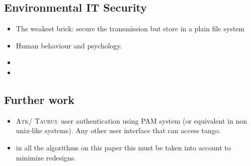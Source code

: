 \documentclass[10pt,a4paper,twoside]{llncs}
\newcommand{\taurus}{\textsc{Taurus}}
\newcommand{\atk}{\textsc{Atk}}
\begin{document}
%
\subsection{Environmental IT Security \label{sec:environment}}

\begin{itemize}
 \item The weakest brick: secure the transmission but store in a plain file system
 \item Human behaviour and psychology.
 \item 
 \item 
\end{itemize}

%
\subsection{Further work \label{sec:further}}

\begin{itemize}
\item \atk/ \taurus\, user authentication using PAM system (or equivalent in non unix-like systems). Any other user interface that can access tango.
\item in all the algorithms on this paper this must be taken into account to minimize redesigns.
\end{itemize}




\end{document}
